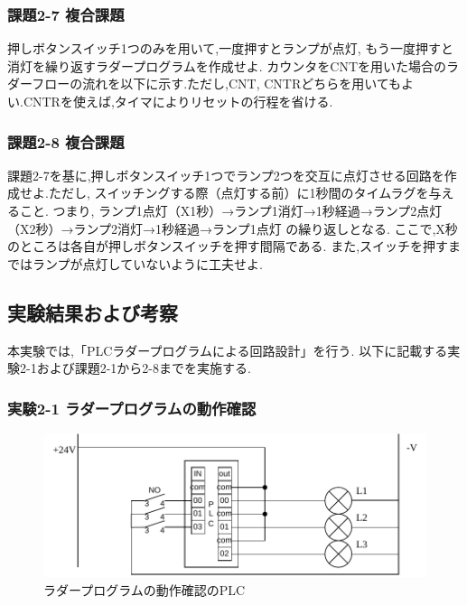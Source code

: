 \subsubsection*{課題2-7 複合課題}
押しボタンスイッチ1つのみを用いて,一度押すとランプが点灯,
もう一度押すと消灯を繰り返すラダープログラムを作成せよ.
カウンタをCNTを用いた場合のラダーフローの流れを以下に示す.ただし,CNT,
CNTRどちらを用いてもよい.CNTRを使えば,タイマによりリセットの行程を省ける.

\subsubsection*{課題2-8 複合課題}
課題2-7を基に,押しボタンスイッチ1つでランプ2つを交互に点灯させる回路を作成せよ.ただし,
スイッチングする際（点灯する前）に1秒間のタイムラグを与えること.
つまり,
ランプ1点灯（X1秒）→ランプ1消灯→1秒経過→ランプ2点灯（X2秒）→ランプ2消灯→1秒経過→ランプ1点灯
の繰り返しとなる.
ここで,X秒のところは各自が押しボタンスイッチを押す間隔である.
また,スイッチを押すまではランプが点灯していないように工夫せよ.


\subsection{実験結果および考察}

本実験では,「PLCラダープログラムによる回路設計」を行う.
以下に記載する実験2-1および課題2-1から2-8までを実施する.

\subsubsection*{実験2-1 ラダープログラムの動作確認}

\begin{figure}[H]
  \centering
  \includegraphics[scale=0.7]{sozai/5.pdf}
  \caption{ラダープログラムの動作確認のPLC}
\end{figure}


